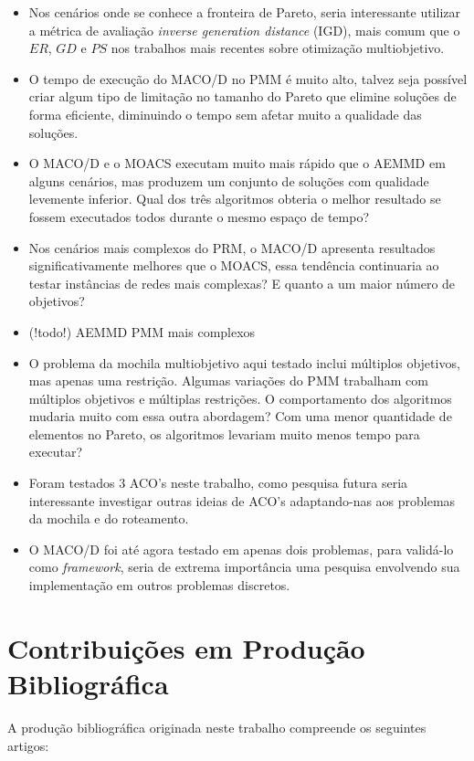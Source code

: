 \begin{itemize}
	\item Nos cenários onde se conhece a fronteira de Pareto, seria interessante utilizar a métrica de avaliação \textit{inverse generation distance} (IGD), mais comum que o $ER$, $GD$ e $PS$ nos trabalhos mais recentes sobre otimização multiobjetivo.
	\item O tempo de execução do MACO/D no PMM é muito alto, talvez seja possível criar algum tipo de limitação no tamanho do Pareto que elimine soluções de forma eficiente, diminuindo o tempo sem afetar muito a qualidade das soluções.
	\item O MACO/D e o MOACS executam muito mais rápido que o AEMMD em alguns cenários, mas produzem um conjunto de soluções com qualidade levemente inferior. Qual dos três algoritmos obteria o melhor resultado se fossem executados todos durante o mesmo espaço de tempo?
	\item Nos cenários mais complexos do PRM, o MACO/D apresenta resultados significativamente melhores que o MOACS, essa tendência continuaria ao testar instâncias de redes mais complexas? E quanto a um maior número de objetivos?
	\item (!todo!) AEMMD PMM mais complexos
	\item O problema da mochila multiobjetivo aqui testado inclui múltiplos objetivos, mas apenas uma restrição. Algumas variações do PMM trabalham com múltiplos objetivos e múltiplas restrições. O comportamento dos algoritmos mudaria muito com essa outra abordagem? Com uma menor quantidade de elementos no Pareto, os algoritmos levariam muito menos tempo para executar?
	\item Foram testados 3 ACO's neste trabalho, como pesquisa futura seria interessante investigar outras ideias de ACO's adaptando-nas aos problemas da mochila e do roteamento.
	\item O MACO/D foi até agora testado em apenas dois problemas, para validá-lo como \textit{framework}, seria de extrema importância uma pesquisa envolvendo sua implementação em outros problemas discretos.
\end{itemize}

\section{Contribuições em Produção Bibliográfica}
A produção bibliográfica originada neste trabalho compreende os seguintes artigos:


